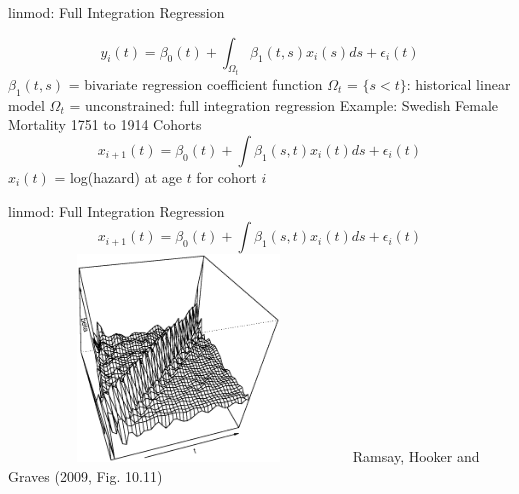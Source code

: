\documentclass[compress]{beamer}
\begin{document}

\begin{frame}{linmod:  Full Integration Regression}

\[
y_i(t) = \beta_0(t) + \int_{\Omega_t} \beta_1(t,s) x_i(s) d s + \epsilon_i(t)
\]
$\beta_1(t,s)$ = bivariate regression coefficient function
$\Omega_t$ = $\{s < t\}$:  historical linear model
$\Omega_t$ = unconstrained:  full integration regression
\newline \newline
Example:  \newline
Swedish Female Mortality 1751 to 1914 Cohorts \newline
\[
x_{i+1}(t) = \beta_0(t) + \int \beta_1(s,t) x_i(t) d s + \epsilon_i(t)
\]
$x_i(t)$ = log(hazard) at age $t$ for cohort $i$ \newline
\end{frame}


\begin{frame}{linmod:  Full Integration Regression}
\[
x_{i+1}(t) = \beta_0(t) + \int \beta_1(s,t) x_i(t) d s + \epsilon_i(t)
\]
\includegraphics[height=5.5cm, width=9cm]{figs/swede_beta1}
\newline
Ramsay, Hooker and Graves (2009, Fig. 10.11)

\end{frame}
\end{document}

